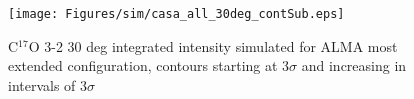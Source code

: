 \documentclass[useAMS,usenatbib]{mn2e}
\begin{document}

%

\begin{figure}
 \texttt{[image: Figures/sim/casa\_all\_30deg\_contSub.eps]}

 \caption{C$^{17}$O 3-2 30 deg integrated intensity simulated for ALMA most extended configuration, contours starting at 3$\sigma$ and increasing in intervals of 3$\sigma$}
\end{figure}


%


%

%
\end{document}
